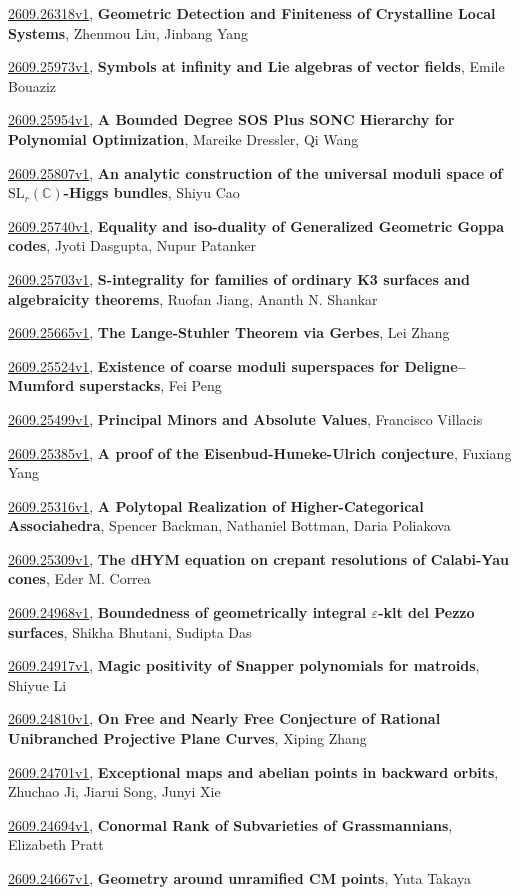 \documentclass[9pt, a4paper]{article}
\theoremstyle{plain}
\theoremstyle{definition}
\theoremstyle{remark}
\newcommand{\arxiv}[3]{\href{https://arxiv.org/abs/#1}{#1}, \textbf{\textcolor{arxivblue}{#2}}, #3}
\begin{document}
\arxiv{2609.26318v1}{Geometric Detection and Finiteness of Crystalline Local Systems}{Zhenmou Liu, Jinbang Yang}

\arxiv{2609.25973v1}{Symbols at infinity and Lie algebras of vector fields}{Emile Bouaziz}

\arxiv{2609.25954v1}{A Bounded Degree SOS Plus SONC Hierarchy for Polynomial Optimization}{Mareike Dressler, Qi Wang}

\arxiv{2609.25807v1}{An analytic construction of the universal moduli space of $\mathrm{SL}_r(\mathbb C)$-Higgs bundles}{Shiyu Cao}

\arxiv{2609.25740v1}{Equality and iso-duality of Generalized Geometric Goppa codes}{Jyoti Dasgupta, Nupur Patanker}

\arxiv{2609.25703v1}{S-integrality for families of ordinary K3 surfaces and algebraicity theorems}{Ruofan Jiang, Ananth N. Shankar}

\arxiv{2609.25665v1}{The Lange-Stuhler Theorem via Gerbes}{Lei Zhang}

\arxiv{2609.25524v1}{Existence of coarse moduli superspaces for Deligne--Mumford superstacks}{Fei Peng}

\arxiv{2609.25499v1}{Principal Minors and Absolute Values}{Francisco Villacis}

\arxiv{2609.25385v1}{A proof of the Eisenbud-Huneke-Ulrich conjecture}{Fuxiang Yang}

\arxiv{2609.25316v1}{A Polytopal Realization of Higher-Categorical Associahedra}{Spencer Backman, Nathaniel Bottman, Daria Poliakova}

\arxiv{2609.25309v1}{The dHYM equation on crepant resolutions of Calabi-Yau cones}{Eder M. Correa}

\arxiv{2609.24968v1}{Boundedness of geometrically integral $ε$-klt del Pezzo surfaces}{Shikha Bhutani, Sudipta Das}

\arxiv{2609.24917v1}{Magic positivity of Snapper polynomials for matroids}{Shiyue Li}

\arxiv{2609.24810v1}{On Free and Nearly Free Conjecture of Rational Unibranched Projective Plane Curves}{Xiping Zhang}

\arxiv{2609.24701v1}{Exceptional maps and abelian points in backward orbits}{Zhuchao Ji, Jiarui Song, Junyi Xie}

\arxiv{2609.24694v1}{Conormal Rank of Subvarieties of Grassmannians}{Elizabeth Pratt}

\arxiv{2609.24667v1}{Geometry around unramified CM points}{Yuta Takaya}
\end{document}
